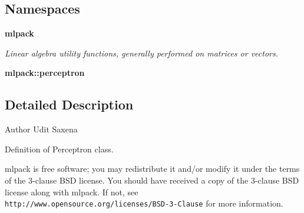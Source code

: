 \subsection*{Namespaces}
\begin{DoxyCompactItemize}
\item 
 {\bf mlpack}
\begin{DoxyCompactList}\small\item\em Linear algebra utility functions, generally performed on matrices or vectors. \end{DoxyCompactList}\item 
 {\bf mlpack\+::perceptron}
\end{DoxyCompactItemize}


\subsection{Detailed Description}
\begin{DoxyAuthor}{Author}
Udit Saxena
\end{DoxyAuthor}
Definition of Perceptron class.

mlpack is free software; you may redistribute it and/or modify it under the terms of the 3-\/clause B\+SD license. You should have received a copy of the 3-\/clause B\+SD license along with mlpack. If not, see {\tt http\+://www.\+opensource.\+org/licenses/\+B\+S\+D-\/3-\/\+Clause} for more information. 